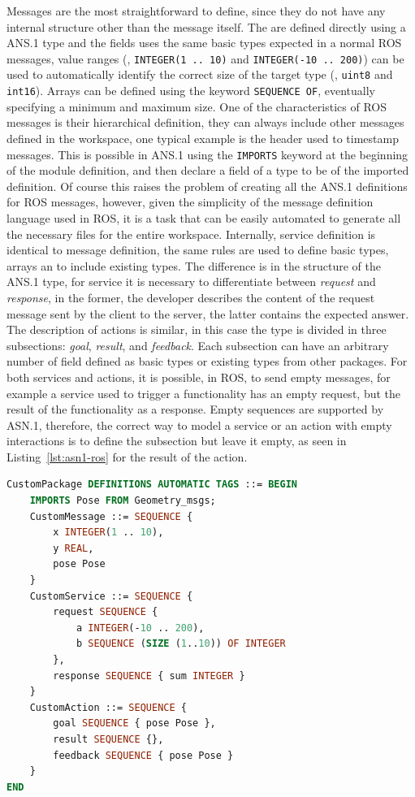 Messages are the most straightforward to define, since they do not have any internal structure other than the message itself. The are defined directly using a ANS.1 type and the fields uses the same basic types expected in a normal ROS messages, value ranges (\eg, \texttt{INTEGER(1 .. 10)} and \texttt{INTEGER(-10 .. 200)}) can be used to automatically identify the correct size of the target type (\eg, \texttt{uint8} and \texttt{int16}). Arrays can be defined using the keyword \texttt{SEQUENCE OF}, eventually specifying a minimum and maximum size. One of the characteristics of ROS messages is their hierarchical definition, they can always include other messages defined in the workspace, one typical example is the header used to timestamp messages. This is possible in ANS.1 using the \texttt{IMPORTS} keyword at the beginning of the module definition, and then declare a field of a type to be of the imported definition. Of course this raises the problem of creating all the ANS.1 definitions for ROS messages, however, given the simplicity of the message definition language used in ROS, it is a task that can be easily automated to generate all the necessary files for the entire workspace. Internally, service definition is identical to message definition, the same rules are used to define basic types, arrays an to include existing types. The difference is in the structure of the ANS.1 type, for service it is necessary to differentiate between \textit{request} and \textit{response}, in the former, the developer describes the content of the request message sent by the client to the server, the latter contains the expected answer. The description of actions is similar, in this case the type is divided in three subsections: \textit{goal}, \textit{result}, and \textit{feedback}. Each subsection can have an arbitrary number of field defined as basic types or existing types from other packages. For both services and actions, it is possible, in ROS, to send empty messages, for example a service used to trigger a functionality has an empty request, but the result of the functionality as a response. Empty sequences are supported by ASN.1, therefore, the correct way to model a service or an action with empty interactions is to define the subsection but leave it empty, as seen in Listing~\ref{lst:asn1-ros} for the result of the action.

\begin{lstlisting}[language=ASN1,caption={ROS message, service and action definition using ASN.1.},label=lst:asn1-ros]
CustomPackage DEFINITIONS AUTOMATIC TAGS ::= BEGIN
	IMPORTS Pose FROM Geometry_msgs;
	CustomMessage ::= SEQUENCE {
		x INTEGER(1 .. 10),
		y REAL,
		pose Pose
	}
	CustomService ::= SEQUENCE {
		request SEQUENCE {
			a INTEGER(-10 .. 200),
			b SEQUENCE (SIZE (1..10)) OF INTEGER
		},
		response SEQUENCE { sum INTEGER }
	}
	CustomAction ::= SEQUENCE {
		goal SEQUENCE { pose Pose },
		result SEQUENCE {},
		feedback SEQUENCE { pose Pose }
	}
END
\end{lstlisting}

